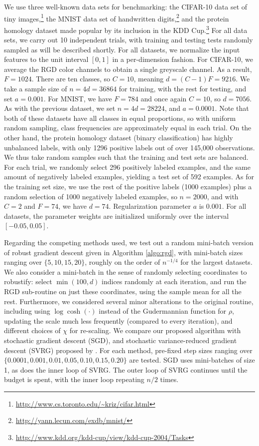 \documentclass[11pt,oneside]{article}
\theoremstyle{definition} \newtheorem{defn}{Definition}       %
\theoremstyle{plain} \newtheorem{prop}[defn]{Proposition}           %
\theoremstyle{plain} \newtheorem{thm}[defn]{Theorem}                %
\theoremstyle{plain} \newtheorem{lem}[defn]{Lemma}                  %
\theoremstyle{plain} \newtheorem{cor}[defn]{Corollary}              %
\theoremstyle{remark} \newtheorem{rmk}[defn]{Remark}                %
\theoremstyle{remark} \newtheorem{ex}[defn]{Example}                %
\begin{document}
We use three well-known data sets for benchmarking: the CIFAR-10 data set of tiny images,\footnote{\url{http://www.cs.toronto.edu/~kriz/cifar.html}} the MNIST data set of handwritten digits,\footnote{\url{http://yann.lecun.com/exdb/mnist/}} and the protein homology dataset made popular by its inclusion in the KDD Cup.\footnote{\url{http://www.kdd.org/kdd-cup/view/kdd-cup-2004/Tasks}} For all data sets, we carry out 10 independent trials, with training and testing tests randomly sampled as will be described shortly. For all datasets, we normalize the input features to the unit interval $[0,1]$ in a per-dimension fashion. For CIFAR-10, we average the RGD color channels to obtain a single greyscale channel. As a result, $F=1024$. There are ten classes, so $C=10$, meaning $d=(C-1)F=9216$. We take a sample size of $n=4d=36864$ for training, with the rest for testing, and set $a=0.001$. For MNIST, we have $F=784$ and once again $C=10$, so $d=7056$. As with the previous dataset, we set $n=4d=28224$, and $a=0.0001$. Note that both of these datasets have all classes in equal proportions, so with uniform random sampling, class frequencies are approximately equal in each trial. On the other hand, the protein homology dataset (binary classification) has highly unbalanced labels, with only 1296 positive labels out of over 145,000 observations. We thus take random samples such that the training and test sets are balanced. For each trial, we randomly select 296 positively labeled examples, and the same amount of negatively labeled examples, yielding a test set of 592 examples. As for the training set size, we use the rest of the positive labels (1000 examples) plus a random selection of 1000 negatively labeled examples, so $n=2000$, and with $C=2$ and $F=74$, we have $d=74$. Regularization parameter $a$ is $0.001$. For all datasets, the parameter weights are initialized uniformly over the interval $[-0.05,0.05]$.

Regarding the competing methods used, we test out a random mini-batch version of robust gradient descent given in Algorithm \ref{algo:rgd}, with mini-batch sizes ranging over $\{5,10,15,20\}$, roughly on the order of $n^{-1/4}$ for the largest datasets. We also consider a mini-batch in the sense of randomly selecting coordinates to robustify: select $\min(100,d)$ indices randomly at each iteration, and run the RGD sub-routine on just these coordinates, using the sample mean for all the rest. Furthermore, we considered several minor alterations to the original routine, including using $\log\cosh(\cdot)$ instead of the Gudermannian function for $\rho$, updating the scale much less frequently (compared to every iteration), and different choices of $\chi$ for re-scaling. We compare our proposed algorithm with stochastic gradient descent (SGD), and stochastic variance-reduced gradient descent (SVRG) proposed by \citet{johnson2013a}. For each method, pre-fixed step sizes ranging over $\{0.0001, 0.001, 0.01, 0.05, 0.10, 0.15, 0.20\}$ are tested. SGD uses mini-batches of size 1, as does the inner loop of SVRG. The outer loop of SVRG continues until the budget is spent, with the inner loop repeating $n/2$ times.
\end{document}
